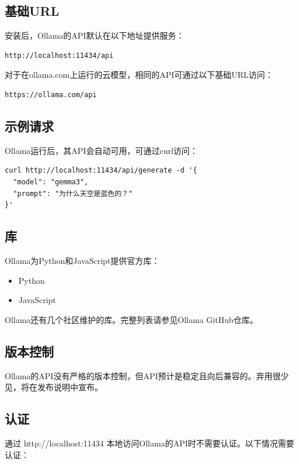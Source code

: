 \documentclass[12pt,UTF8]{ctexbook}
\begin{document}
\subsection{基础URL}

安装后，Ollama的API默认在以下地址提供服务：

\begin{verbatim}
http://localhost:11434/api
\end{verbatim}

对于在ollama.com上运行的云模型，相同的API可通过以下基础URL访问：

\begin{verbatim}
https://ollama.com/api
\end{verbatim}

\subsection{示例请求}

Ollama运行后，其API会自动可用，可通过curl访问：

\begin{verbatim}
curl http://localhost:11434/api/generate -d '{
  "model": "gemma3",
  "prompt": "为什么天空是蓝色的？"
}'
\end{verbatim}

\subsection{库}

Ollama为Python和JavaScript提供官方库：

\begin{itemize}
  \item Python
  \item JavaScript
\end{itemize}

Ollama还有几个社区维护的库。完整列表请参见Ollama GitHub仓库。

\subsection{版本控制}

Ollama的API没有严格的版本控制，但API预计是稳定且向后兼容的。弃用很少见，将在发布说明中宣布。

\subsection{认证}

通过 http://localhost:11434 本地访问Ollama的API时不需要认证。以下情况需要认证：
\end{document}
